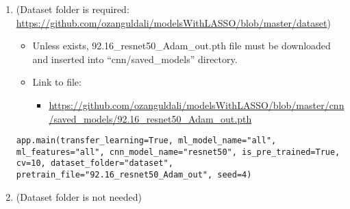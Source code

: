 \begin{enumerate}
	\itemsep1pt\parskip0pt
	\item
	(Dataset folder is required:
	\url{https://github.com/ozanguldali/modelsWithLASSO/blob/master/dataset})\\
	
	\begin{itemize}
		\itemsep1pt\parskip0pt
		\item
		Unless exists, 92.16\_resnet50\_Adam\_out.pth file must be downloaded
		and inserted into ``cnn/saved\_models'' directory.\\
		\item
		Link to file:\\
		\begin{itemize}
			\item 
			\url{https://github.com/ozanguldali/modelsWithLASSO/blob/master/cnn/saved_models/92.16_resnet50_Adam_out.pth}
		\end{itemize}
		
	\end{itemize}
	
	\texttt{app.main(transfer\_learning=True, ml\_model\_name="all", ml\_features="all", cnn\_model\_name="resnet50", is\_pre\_trained=True,          cv=10, dataset\_folder="dataset", pretrain\_file="92.16\_resnet50\_Adam\_out", seed=4)}
	
	\itemsep1pt\parskip0pt
	\item (Dataset folder is not needed)
	

\end{enumerate}
